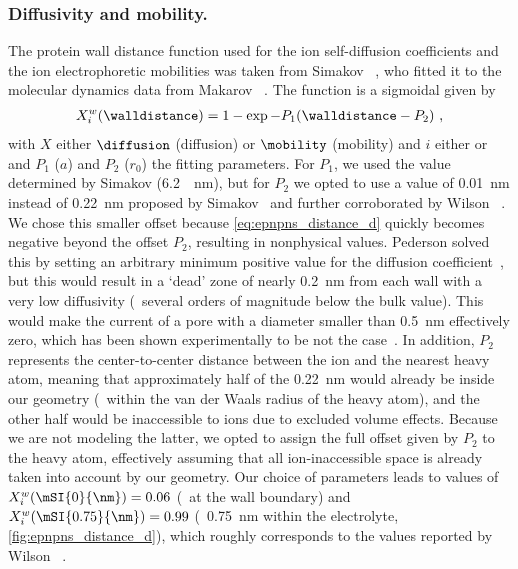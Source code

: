 \subsubsection{Diffusivity and mobility.}
%
The protein wall distance function used for the ion self-diffusion coefficients and the ion electrophoretic
mobilities was taken from Simakov \etal{}~\cite{Simakov-2010}, who fitted it to the molecular dynamics data
from Makarov \etal{}~\cite{Makarov-1998}. The function is a sigmoidal given by
%
\begin{align}\label{eq:epnpns_distance_d}
  X_{i}^w (\walldistance) = 1 - \exp{-P_1 (\walldistance - P_2)}
  \text{ ,}
\end{align}
%
with $X$ either $\diffusion$ (diffusion) or $\mobility$ (mobility) and $i$ either \Na{} or \Cl{} and $P_1$
($a$) and $P_2$ ($r_0$) the fitting parameters. For $P_1$, we used the value determined by Simakov \etal{}
(\SI{6.2}{\per\nm}), but for $P_2$ we opted to use a value of \SI{0.01}{\nm} instead of \SI{0.22}{\nm}
proposed by Simakov~\cite{Simakov-2010} and further corroborated by Wilson \etal{}~\cite{Wilson-2019}. We
chose this smaller offset because \cref{eq:epnpns_distance_d} quickly becomes negative beyond the offset
$P_2$, resulting in nonphysical values. Pederson \etal{} solved this by setting an arbitrary minimum positive
value for the diffusion coefficient~\cite{Pederson-2015}, but this would result in a `dead' zone of nearly
\SI{0.2}{\nm} from each wall with a very low diffusivity (\ie~several orders of magnitude below the bulk
value). This would make the current of a pore with a diameter smaller than \SI{0.5}{\nm} effectively zero,
which has been shown experimentally to be not the case~\cite{Rigo-2019}. In addition, $P_2$ represents the
center-to-center distance between the ion and the nearest heavy atom, meaning that approximately half of the
\SI{0.22}{\nm} would already be inside our geometry (\ie~within the van der Waals radius of the heavy atom),
and the other half would be inaccessible to ions due to excluded volume effects. Because we are not modeling
the latter, we opted to assign the full offset given by $P_2$ to the heavy atom, effectively assuming that all
ion-inaccessible space is already taken into account by our geometry. Our choice of parameters leads to
values of $X_{i}^w (\mSI{0}{\nm}) = 0.06$ (\ie~at the wall boundary) and $X_{i}^w (\mSI{0.75}{\nm}) = 0.99$
(\ie~\SI{0.75}{\nm} within the electrolyte, \cref{fig:epnpns_distance_d}), which roughly corresponds to the
values reported by Wilson \etal{}~\cite{Wilson-2019}.
%

